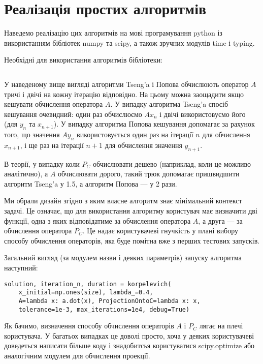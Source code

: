 \section{Реалізація простих алгоритмів}

Наведемо реалізацію цих алгоритмів на мові програмування python із використанням бібліотек numpy та scipy, а також зручних модулів time і typing. \medskip

Необхідні для використання алгоритмів бібліотеки:
\inputminted[linenos,fontsize=\tiny]{python}{src/__init__.py}

\begin{remark}
    У наведеному вище вигляді алгоритми Tseng'a і Попова обчислюють оператор $A$ тричі і двічі на кожну ітерацію відповідно. На цьому можна заощадити якщо кешувати обчислення оператора $A$. У випадку алгоритма Tseng'a спосіб кешування очевидний: один раз обчислюємо $A x_n$ і двічі використовуємо його (для $y_n$ та $x_{n + 1}$). У випадку алгоритма Попова кешування допомагає за рахунок того, що значення $A y_n$ використовується один раз на ітерації $n$ для обчислення $x_{n + 1}$, і ще раз на ітерації $n + 1$ для обчислення значення $y_{n + 1}$. \medskip
    
    В теорії, у випадку коли $P_C$ обчислювати дешево (наприклад, коли це можливо аналітично), а $A$ обчислювати дорого, такий трюк допомагає пришвидшити алгоритм Tseng'a у 1.5, а алгоритм Попова --- у 2 рази.
\end{remark}

\begin{remark}
    Ми обрали дизайн згідно з яким власне алгоритм знає мінімальний контекст задачі. Це означає, що для використання алгоритму користувач має визначити дві функції, одна з яких відповідатиме за обчислення оператора $A$, а друга --- за обчислення оператора $P_C$. Це надає користувачеві гнучкість у плані вибору способу обчислення операторів, яка буде помітна вже з перших тестових запусків.
\end{remark}

Загальний вигляд (за модулем назви і деяких параметрів) запуску алгоритма наступний:
\begin{verbatim}
solution, iteration_n, duration = korpelevich(
    x_initial=np.ones(size), lambda_=0.4,
    A=lambda x: a.dot(x), ProjectionOntoC=lambda x: x,
    tolerance=1e-3, max_iterations=1e4, debug=True)
\end{verbatim}

Як бачимо, визначення способу обчислення операторів $A$ і $P_C$ лягає на плечі користувача. У багатьох випадках це доволі просто, хоча у деяких користувачеві доведеться написати більше коду і знадобитсья користуватися scipy.optimize або  аналогічним модулем для обчислення проекції.

